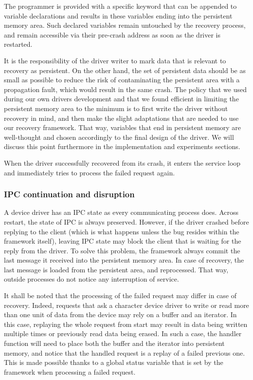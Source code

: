 \documentclass{acm_proc_article-sp}
\begin{document}
The programmer is provided with a specific keyword that can be appended to variable declarations and results in these variables ending into the persistent memory area. Such declared variables remain untouched by the recovery process, and remain accessible via their pre-crash address as soon as the driver is restarted.

It is the responsibility of the driver writer to mark data that is relevant to recovery as persistent. On the other hand, the set of persistent data should be as small as possible to reduce the risk of contaminating the persistent area with a propagation fault, which would result in the same crash. The policy that we used during our own drivers development and that we found efficient in limiting the persistent memory area to the minimum is to first write the driver without recovery in mind, and then make the slight adaptations that are needed to use our recovery framework. That way, variables that end in persistent memory are well-thought and chosen accordingly to the final design of the driver. We will discuss this point furthermore in the implementation and experiments sections.

When the driver successfully recovered from its crash, it enters the service loop and immediately tries to process the failed request again.

\subsubsection{IPC continuation and disruption}
A device driver has an IPC state as every communicating process does.  Across restart, the state of IPC is always preserved.  However, if the driver crashed before replying to the client (which is what happens unless the bug resides within the framework itself), leaving IPC state may block the client that is waiting for the reply from the driver.  To solve this problem, the framework always commit the last message it received into the persistent memory area.  In case of recovery, the last message is loaded from the persistent area, and reprocessed. That way, outside processes do not notice any interruption of service.

It shall be noted that the processing of the failed request may differ in case of recovery. Indeed, requests that ask a character device driver to write or read more than one unit of data from the device may rely on a buffer and an iterator. In this case, replaying the whole request from start may result in data being written multiple times or previously read data being erased. In such a case, the handler function will need to place both the buffer and the iterator into persistent memory, and notice that the handled request is a replay of a failed previous one. This is made possible thanks to a global status variable that is set by the framework when processing a failed request.
\end{document}
